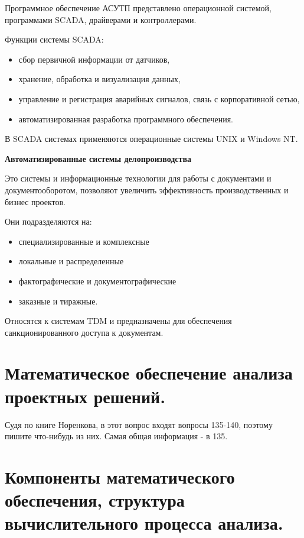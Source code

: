 \documentclass[unicode, 12pt, a4paper, oneside]{article}
\begin{document}
Программное обеспечение  АСУТП представлено операционной системой, программами SCADA, драйверами и контроллерами.

Функции системы SCADA:

\begin{itemize}
\item сбор первичной информации от датчиков,
\item хранение, обработка и визуализация данных,
\item управление и регистрация аварийных сигналов, связь с корпоративной сетью,
\item автоматизированная разработка программного обеспечения.
\end{itemize}

В SCADA системах применяются операционные системы UNIX и Windows NT.

\textbf{Автоматизированные системы делопроизводства}

Это системы и информационные технологии для работы с документами и документооборотом, позволяют увеличить эффективность производственных и бизнес проектов. 

Они подразделяются на: 

\begin{itemize}
\item специализированные и комплексные
\item локальные и распределенные
\item фактографические и документографические
\item заказные и тиражные. 
\end{itemize}

Относятся к системам TDM и предназначены для обеспечения санкционированного доступа к документам.

\section{Математическое обеспечение анализа проектных решений.}

Судя по книге Норенкова, в этот вопрос входят вопросы 135-140, поэтому пишите что-нибудь из них. Самая общая информация - в 135.

\section{Компоненты математического обеспечения, структура вычислительного процесса анализа.}
\end{document}
